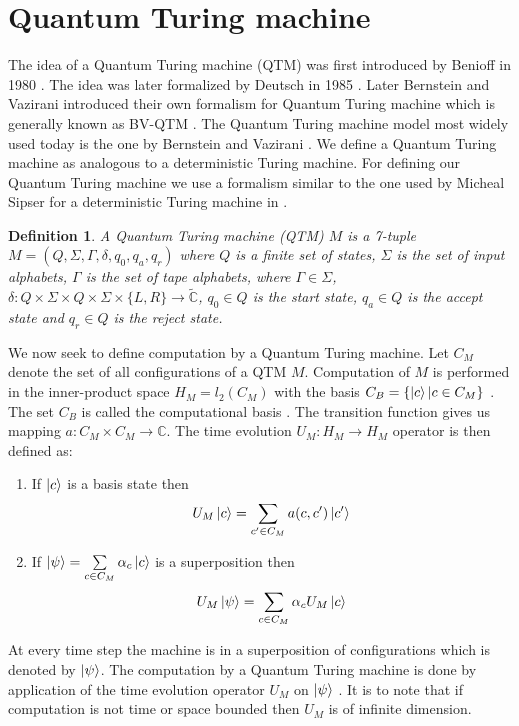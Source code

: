 \documentclass[11pt,a4paper]{article}
\newtheorem{definition}{Definition}
\begin{document}
\section{Quantum Turing machine}
    The idea of a Quantum Turing machine (QTM) was first introduced by Benioff in 1980 \cite{15}\cite{16}. 
    The idea was later formalized by Deutsch in 1985 \cite{9}. Later Bernstein and Vazirani introduced their own formalism for Quantum Turing machine which is generally known as BV-QTM \cite{5}\cite{4}\cite{8}.
    The Quantum Turing machine model most widely used today is the one by Bernstein and Vazirani \cite{17}.
    We define a Quantum Turing machine as analogous to a deterministic Turing machine. For defining our Quantum Turing machine we use a formalism similar to the one used by Micheal Sipser for a deterministic Turing machine in \cite{10}.
    \begin{definition}
        A Quantum Turing machine (QTM) $M$ is a 7-tuple $M = (Q, \Sigma, \Gamma, \delta, q_0, q_a, q_r)$ where $Q$ is a finite set of states, 
        $\Sigma$ is the set of input alphabets, $\Gamma$ is the set of tape alphabets, where $\Gamma \in \Sigma$, $\delta: Q \times \Sigma \times Q \times \Sigma \times \{L,R\} \to \widetilde{\mathbb{C}}$, $q_0\in Q$ is the start state, $q_a\in Q$ is the accept state and $q_r\in Q$ is the reject state.
    \end{definition}
    We now seek to define computation by a Quantum Turing machine. Let $C_M$ denote the set of all configurations of a QTM $M$.
    Computation of $M$ is performed in the inner-product space $H_M = l_2(C_M)$ with the basis $C_B = \{\ket{c} | c \in C_M\}$ \cite{5}\cite{17}. The set $C_B$ is called the computational basis \cite{4}.
    The transition function gives us mapping $a : C_M \times C_M \to \mathbb{C}$. The time evolution $U_M : H_M \to H_M$ operator is then defined as:
    \begin{enumerate}
        \item If $\ket{c}$ is a basis state then
        $$U_M\ket{c} = \sum\limits_{c'\in C_M} a(c,c')\ket{c'}$$
        \item If $\ket{\psi} = \sum\limits_{c\in C_M} \alpha_c\ket{c}$ is a superposition then 
         $$U_M\ket{\psi} = \sum\limits_{c\in C_M} \alpha_c U_M\ket{c}$$
    \end{enumerate}
    At every time step the machine is in a superposition of configurations which is denoted by $\ket{\psi}$.
    The computation by a Quantum Turing machine is done by application of the time evolution operator $U_M$ on $\ket{\psi}$ \cite{4}\cite{5}\cite{8}\cite{17}. It is to note that if computation is not time or space bounded then $U_M$ is of infinite dimension.
\end{document}
